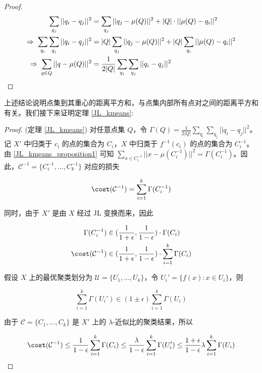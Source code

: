 \documentclass[lang=cn,newtx,10pt,scheme=chinese,chinesefont=nofont,citestyle=gb7714-2015, bibstyle=gb7714-2015]{elegantbook}
\begin{document}
\begin{refsection}
\begin{proof}
    \begin{align}
        \sum_{q_j}||q_i-q_j||^2 &= \sum_{q_j}||q_j-\mu(Q)||^2 + |Q|\cdot||\mu(Q)-q_i||^2 \notag \\
        \Rightarrow\;\sum_{q_i}\sum_{q_j}||q_i-q_j||^2 &= |Q|\sum_{q_j}||q_j-\mu(Q)||^2 + |Q|\sum_{q_i}||\mu(Q)-q_i||^2 \notag \\
        \Rightarrow\;\sum_{q\in Q}||q-\mu(Q)||^2 &= \frac{1}{2|Q|}\sum_{q_i}\sum_{q_j}||q_i-q_j||^2 \notag
    \end{align}
\end{proof}

上述结论说明点集到其重心的距离平方和，与点集内部所有点对之间的距离平方和有关。我们接下来证明定理 \ref{JL_kmeans}:

\begin{proof}(定理 \ref{JL_kmeans})
    对任意点集 $Q$，令 $\Gamma(Q)=\frac{1}{2|Q|}\sum_{q_i}\sum_{q_j}||q_i-q_j||^2$。记 $X'$ 中归类于 $c_i$ 的点的集合为 $C_i$，$X$ 中归类于 $f^{-1}(c_i)$ 的点的集合为 $C_i^{-1}$。由 \cref{JL_kmeans_proposition1} 可知 $\sum_{x\in C^{-1}_i}||x-\mu(C_i^{-1})||^2 = \Gamma(C_i^{-1})$。因此，$\mathcal{C}^{-1}=\{C_i^{-1},\dots,C_k^{-1}\}$ 对应的损失

    \begin{equation*}
        \cost(\mathcal{C}^{-1}) = \sum_{i=1}^k \Gamma(C_i^{-1}) 
    \end{equation*}

    同时，由于 $X'$ 是由 $X$ 经过 JL 变换而来，因此

    \begin{align*}
        \Gamma(C_i^{-1}) &\in (\frac{1}{1+\epsilon}, \frac{1}{1-\epsilon})\cdot\Gamma(C_i) \\
        \cost(\mathcal{C}^{-1}) &\in (\frac{1}{1+\epsilon}, \frac{1}{1-\epsilon})\cdot\sum_{i=1}^k\Gamma(C_i)
    \end{align*}

    假设 $X$ 上的最优聚类划分为 $\mathcal{U}=\{U_1, \dots, U_k\}$，令 $U_i'=\{f(x):x\in U_i\}$，则

    \begin{equation*}
        \sum_{i=1}^k\Gamma(U_i') \in (1\pm\epsilon)\sum_{i=1}^k\Gamma(U_i)
    \end{equation*}

    由于 $\mathcal{C}=\{C_1,\dots,C_k\}$ 是 $X'$ 上的 $\lambda$-近似比的聚类结果，所以

    \begin{equation*}
        \cost(\mathcal{C}^{-1}) \le \frac{1}{1-\epsilon}\sum_{i=1}^k\Gamma(C_i) \le \frac{\lambda}{1-\epsilon}\sum_{i=1}^k\Gamma(U_i') \le \frac{1+\epsilon}{1-\epsilon}\lambda\sum_{i=1}^{k}\Gamma(U_i)
    \end{equation*}
\end{proof}


\end{refsection}
\end{document}
